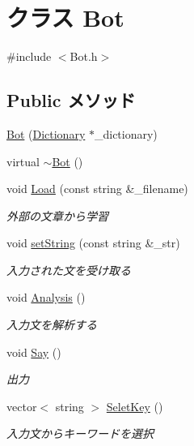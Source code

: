 \hypertarget{class_bot}{\section{クラス Bot}
\label{class_bot}
}


{\ttfamily \#include $<$Bot.\-h$>$}

\subsection*{Public メソッド}
\begin{DoxyCompactItemize}
\item 
\hyperlink{class_bot_ab140d5c5ded410a715339d97f653e197}{Bot} (\hyperlink{class_dictionary}{Dictionary} $\ast$\-\_\-dictionary)
\item 
virtual \hyperlink{class_bot_a4163b0f6c91f94cbeb3145eeda8cd361}{$\sim$\-Bot} ()
\item 
void \hyperlink{class_bot_abfffad625b53294641a4c5041f416225}{Load} (const string \&\-\_\-filename)
\begin{DoxyCompactList}\small\item\em 外部の文章から学習 \end{DoxyCompactList}\item 
void \hyperlink{class_bot_a309cc2538b3d71e4ee6b131e7cbded66}{set\-String} (const string \&\-\_\-str)
\begin{DoxyCompactList}\small\item\em 入力された文を受け取る \end{DoxyCompactList}\item 
void \hyperlink{class_bot_af5b2d1eda805d3b04a43ea7997caced2}{Analysis} ()
\begin{DoxyCompactList}\small\item\em 入力文を解析する \end{DoxyCompactList}\item 
void \hyperlink{class_bot_a445c5af613f2ca28ebde9b94d3a28c42}{Say} ()
\begin{DoxyCompactList}\small\item\em 出力 \end{DoxyCompactList}\item 
vector$<$ string $>$ \hyperlink{class_bot_a744494ce244fd61f18e76145c62db3bc}{Selet\-Key} ()
\begin{DoxyCompactList}\small\item\em 入力文からキーワードを選択 \end{DoxyCompactList}\end{DoxyCompactItemize}


